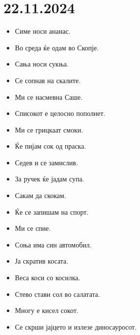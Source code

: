 \documentclass[a5paper,12pt]{article}
\begin{document}
\section{22.11.2024} 
\begin{itemize}
  \item Симе носи ананас.
  \item Во среда ќе одам во Скопје.
  \item Сања носи сукња.
  \item Се сопнав на скалите.
  \item Ми се насмевна Саше.
  \item Списокот е целосно пополнет.
  \item Ми се грицкаат смоки.
  \item Ќе пијам сок од праска.
  \item Седев и се замислив.
  \item За ручек ќе јадам супа.
  \item Сакам да скокам.
  \item Ќе се запишам на спорт.
  \item Ми се спие.
  \item Соња има син автомобил.
  \item Ја скратив косата.
  \item Веса коси со косилка.
  \item Стево стави сол во салатата.
  \item Многу е кисел сокот.
  \item Се скрши јајцето и излезе диносауросот.
\end{itemize}
\end{document}
